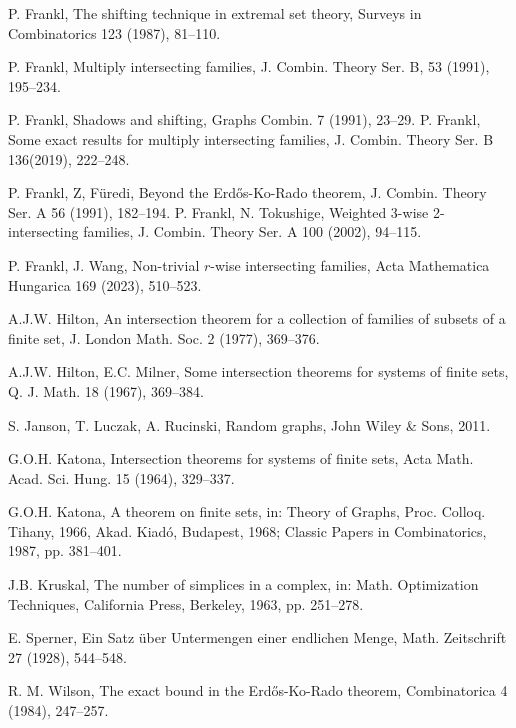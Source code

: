 \documentclass[11pt,a4paper]{article}
\newtheorem{false statement}{False statement}
\theoremstyle{definition}
\begin{document}
\begin{thebibliography}{10}
 P. Frankl, The shifting technique in extremal set theory, Surveys in Combinatorics  123 (1987), 81--110.

P. Frankl, Multiply intersecting families,  J. Combin. Theory Ser. B, 53 (1991), 195--234.

P. Frankl, Shadows and shifting, Graphs Combin. 7 (1991), 23--29.
P. Frankl,
Some exact results for multiply intersecting families, J. Combin. Theory  Ser. B 136(2019), 222--248.

    P. Frankl, Z, F\"{u}redi, Beyond the Erd\H{o}s-Ko-Rado theorem, J. Combin. Theory Ser. A 56 (1991),  182--194.
  P. Frankl, N. Tokushige, Weighted 3-wise 2-intersecting families,  J. Combin. Theory Ser. A 100 (2002),  94--115.

 P. Frankl, J. Wang, Non-trivial $r$-wise intersecting families,  Acta Mathematica Hungarica  169 (2023),  510--523.

A.J.W. Hilton, An intersection theorem for a collection of families of subsets of  a finite set, J. London Math. Soc. 2 (1977), 369--376.

 A.J.W. Hilton, E.C. Milner, Some intersection theorems for systems of finite sets, Q. J. Math. 18  (1967), 369--384.

S. Janson, T. Luczak, A. Rucinski, Random graphs, John Wiley \& Sons, 2011.

G.O.H. Katona, Intersection theorems for systems of finite sets, Acta Math. Acad. Sci. Hung. 15 (1964), 329--337.

G.O.H. Katona, A theorem on finite sets, in: Theory of Graphs, Proc. Colloq. Tihany, 1966, Akad.
Kiad\'{o}, Budapest, 1968; Classic Papers in Combinatorics, 1987, pp. 381--401.

J.B. Kruskal, The number of simplices in a complex, in: Math. Optimization Techniques, California Press, Berkeley, 1963, pp. 251--278.

E. Sperner, Ein Satz \"{u}ber Untermengen einer endlichen Menge, Math. Zeitschrift 27 (1928), 544--548.


R. M. Wilson, The exact bound in the Erd\H{o}s-Ko-Rado theorem, Combinatorica 4 (1984), 247--257.

\end{thebibliography}
\end{document}
